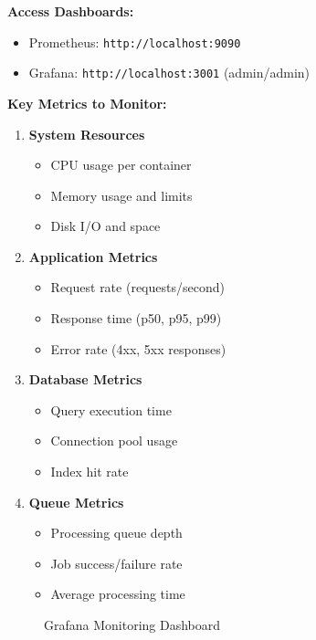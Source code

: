 \textbf{Access Dashboards:}
\begin{itemize}
    \item Prometheus: \texttt{http://localhost:9090}
    \item Grafana: \texttt{http://localhost:3001} (admin/admin)
\end{itemize}

\textbf{Key Metrics to Monitor:}
\begin{enumerate}
    \item \textbf{System Resources}
    \begin{itemize}
        \item CPU usage per container
        \item Memory usage and limits
        \item Disk I/O and space
    \end{itemize}
    
    \item \textbf{Application Metrics}
    \begin{itemize}
        \item Request rate (requests/second)
        \item Response time (p50, p95, p99)
        \item Error rate (4xx, 5xx responses)
    \end{itemize}
    
    \item \textbf{Database Metrics}
    \begin{itemize}
        \item Query execution time
        \item Connection pool usage
        \item Index hit rate
    \end{itemize}
    
    \item \textbf{Queue Metrics}
    \begin{itemize}
        \item Processing queue depth
        \item Job success/failure rate
        \item Average processing time
    \end{itemize}
\end{enumerate}

\begin{figure}[h]
\centering
{}
\caption{Grafana Monitoring Dashboard}
\label{fig:grafana-monitoring}
\end{figure}

